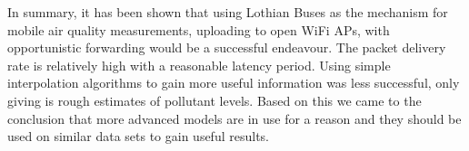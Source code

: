 In summary, it has been shown that using Lothian Buses as the mechanism for mobile air quality measurements, uploading to open WiFi APs, with opportunistic forwarding would be a successful endeavour. The packet delivery rate is relatively high with a reasonable latency period. Using simple interpolation algorithms to gain more useful information was less successful, only giving is rough estimates of pollutant levels. Based on this we came to the conclusion that more advanced models are in use for a reason and they should be used on similar data sets to gain useful results. 

